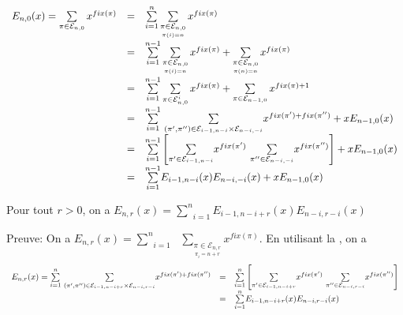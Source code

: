\[
	\begin{array}{l l l}
		E_{n, 0}(x) = \sum\limits_{\pi \in \mathcal{E}_{n, 0}}x^{fix(\pi)} & = & \sum\limits_{i=1}^{n} \sum\limits_{\underset{\pi(i)=n }{\pi \in \mathcal{E}_{n,0} }} x^{fix(\pi)}                                                                                                   \\
		                                                                   & = & \sum\limits_{i=1}^{n-1} \sum\limits_{\underset{\pi(i)=n }{\pi \in \mathcal{E}_{n,0} }} x^{fix(\pi)} + \sum\limits_{\underset{\pi(n)=n }{\pi \in \mathcal{E}_{n,0} }}x^{fix(\pi)}                    \\
		                                                                   & = & \sum\limits_{i=1}^{n-1} \sum\limits_{\pi \in \mathcal{E}_{n,0}^{i} } x^{fix(\pi)} + \sum\limits_{\pi \in \mathcal{E}_{n-1,0} }x^{fix(\pi)+1}                                                        \\
		                                                                   & = & \underset{i=1}{\overset{n-1}{\sum}} \text{ } \underset{(\pi', \pi'') \in \mathcal{E}_{i-1,n-i}\times \mathcal{E}_{n-i,-i}}{\sum}x^{fix(\pi') + fix(\pi'')} + xE_{n-1,0}(x)                          \\
		                                                                   & = & \underset{i=1}{\overset{n-1}{\sum}}\left[ \underset{\pi' \in \mathcal{E}_{i-1,n-i}}{\sum}x^{fix(\pi')}\text{ }\underset{\pi'' \in \mathcal{E}_{n-i,-i}}{\sum}x^{fix(\pi'')} \right] + xE_{n-1,0}(x) \\
		                                                                   & = & \underset{i=1}{\overset{n-1}{\sum}}E_{i-1,n-i}(x)E_{n-i,-i}(x) +  xE_{n-1,0}(x)
	\end{array}
\]
\begin{proposition}\label{p9}
	Pour tout $r>0$, on a $E_{n,r}(x) = \underset{i=1}{\overset{n}{\sum}}E_{i-1,n-i+r}(x)E_{n-i,r-i}(x)$
\end{proposition}
Preuve: On a $E_{n,r}(x) =\underset{i=1}{\overset{n}{\sum}}\text{ }\underset{\underset{\pi_{i}=n+r}{\pi \in \mathcal{E}_{n,r}}}{\sum}x^{fix(\pi)}$.
En utilisant la , on a $$\begin{array}{l l l}
		E_{n,r}(x) = \underset{i=1}{\overset{n}{\sum}} \text{ } \underset{(\pi', \pi'') \in \mathcal{E}_{i-1,n-i+r}\times \mathcal{E}_{n-i,r-i}}{\sum}x^{fix(\pi') + fix(\pi'')} & = & \underset{i=1}{\overset{n}{\sum}}\left[ \underset{\pi' \in \mathcal{E}_{i-1,n-i+r}}{\sum}x^{fix(\pi')}\text{ }\underset{\pi'' \in \mathcal{E}_{n-i,r-i}}{\sum}x^{fix(\pi'')} \right] \\
		                                                                                                                                                                         & = & \underset{i=1}{\overset{n}{\sum}}E_{i-1,n-i+r}(x)E_{n-i,r-i}(x)
	\end{array}$$
